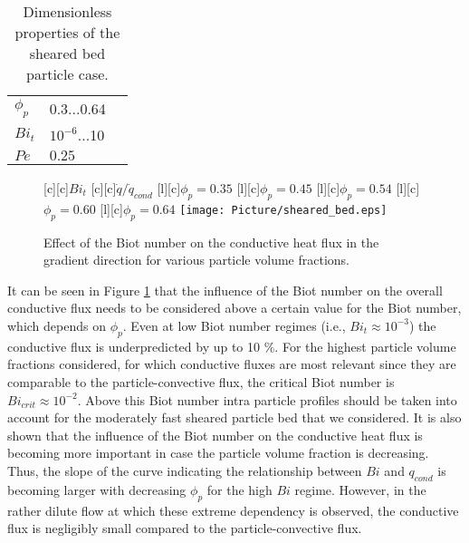 \documentclass{particles2015}
\begin{document}
\begin{table}[h]
  \centering 
  \caption{Dimensionless properties of the sheared bed particle case.}
   \begin{tabular}{llr}
      \hline 
        $\phi_p$				& 0.3...0.64 &\\
        $Bi_t$					& $10^{-6}$...10 & \\
        $Pe$ 					& $0.25$& \\
      \hline      
       \end{tabular}
   \setlength{\belowcaptionskip}{12pt}
   \label{tab:properties_sheard_bed}
\end{table}


\begin{figure}[h!]
   \centering
	[c]{$Bi_t$}
   	[c][c]{$\dot{q}/\dot{q}_{cond}$}
   	[l][c]{\scriptsize{$\phi_p = 0.35$}}
   	[l][c]{\scriptsize{$\phi_p = 0.45$}}
   	[l][c]{\scriptsize{$\phi_p = 0.54$}}
   	[l][c]{\scriptsize{$\phi_p = 0.60$}}
   	[l][c]{\scriptsize{$\phi_p = 0.64$}}
   \texttt{[image: Picture/sheared\_bed.eps]}
   \caption{Effect of the Biot number on the conductive heat flux in the gradient direction for various particle volume fractions.}
   \label{fig:sheared_bed}
\end{figure}

It can be seen in Figure \ref{fig:sheared_bed} that the influence of the Biot number on the overall conductive flux needs to be considered above a certain value for the Biot number, which depends on $\phi_p$. Even at low Biot number regimes (i.e., $Bi_t \approx 10^{-3}$) the conductive flux is underpredicted by up to 10 $\%$. For the highest particle volume fractions considered, for which conductive fluxes are most relevant since they are comparable to the particle-convective flux, the critical Biot number is $Bi_{crit} \approx 10^{-2}$. Above this Biot number intra particle profiles should be taken into account for the moderately fast sheared particle bed that we considered. It is also shown that the influence of the Biot number on the conductive heat flux is becoming more important in case the particle volume fraction is decreasing. Thus, the slope of the curve indicating the relationship between $Bi$ and $q_{cond}$ is becoming larger with decreasing $\phi_p$ for the high $Bi$ regime. However, in the rather dilute flow at which these extreme dependency is observed, the conductive flux is negligibly small compared to the particle-convective flux. 
\end{document}
